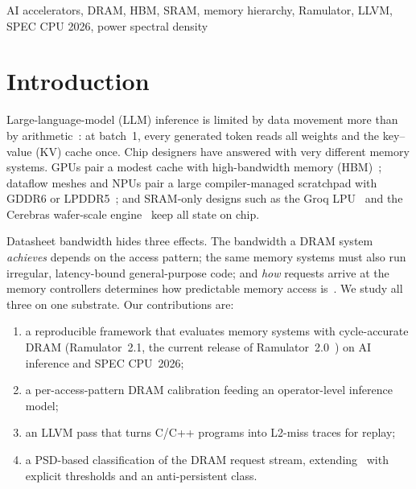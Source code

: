 \documentclass[conference]{IEEEtran}
\begin{document}
\begin{IEEEkeywords}
AI accelerators, DRAM, HBM, SRAM, memory hierarchy, Ramulator, LLVM, SPEC CPU 2026, power spectral density
\end{IEEEkeywords}

\section{Introduction}
Large-language-model (LLM) inference is limited by data movement more than by arithmetic~\cite{wulf1995,gholami2024}: at batch~1, every generated token reads all weights and the key--value (KV) cache once. Chip designers have answered with very different memory systems. GPUs pair a modest cache with high-bandwidth memory (HBM)~\cite{choquette2023}; dataflow meshes and NPUs pair a large compiler-managed scratchpad with GDDR6 or LPDDR5~\cite{vasiljevic2021}; and SRAM-only designs such as the Groq LPU~\cite{abts2020} and the Cerebras wafer-scale engine~\cite{lie2023} keep all state on chip.

Datasheet bandwidth hides three effects. The bandwidth a DRAM system \emph{achieves} depends on the access pattern; the same memory systems must also run irregular, latency-bound general-purpose code; and \emph{how} requests arrive at the memory controllers determines how predictable memory access is~\cite{agarwal2025}. We study all three on one substrate. Our contributions are:
\begin{enumerate}
\item a reproducible framework that evaluates memory systems with cycle-accurate DRAM (Ramulator~2.1, the current release of Ramulator~2.0~\cite{luo2024}) on AI inference and SPEC CPU~2026;
\item a per-access-pattern DRAM calibration feeding an operator-level inference model;
\item an LLVM pass that turns C/C++ programs into L2-miss traces for replay;
\item a PSD-based classification of the DRAM request stream, extending~\cite{agarwal2025} with explicit thresholds and an anti-persistent class.
\end{enumerate}

\end{document}
